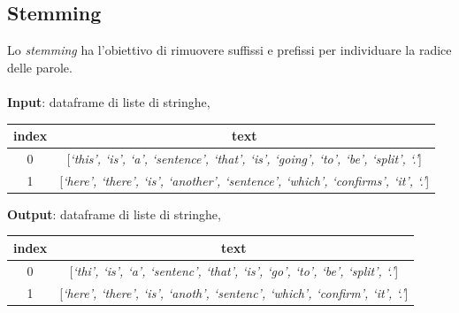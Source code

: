 \documentclass[12pt]{report}
\theoremstyle{definition}
\begin{document}
\subsection{Stemming}
Lo \textit{stemming} ha l'obiettivo di rimuovere suffissi e prefissi per individuare la radice delle parole.
\\
\\
\textbf{Input}: dataframe di liste di stringhe,
\begin{center}
    \begin{tabular}{|c|c|}
    \hline
    \textbf{index} & \textbf{text} \\
    \hline
         0 & [\textit{`this', `is', `a', `sentence', `that', `is', `going', `to', `be', `split', `.'}]\\
         1 & [\textit{`here', `there', `is', `another', `sentence', `which', `confirms', `it', `.'}]\\
    \hline
    \end{tabular}
\end{center}
\textbf{Output}: dataframe di liste di stringhe,
\begin{center}
    \begin{tabular}{|c|c|}
    \hline
    \textbf{index} & \textbf{text} \\
    \hline
         0 & [\textit{`thi', `is', `a', `sentenc', `that', `is', `go', `to', `be', `split', `.'}]\\
         1 & [\textit{`here', `there', `is', `anoth', `sentenc', `which', `confirm', `it', `.'}]\\
    \hline
    \end{tabular}
\end{center}
\end{document}
